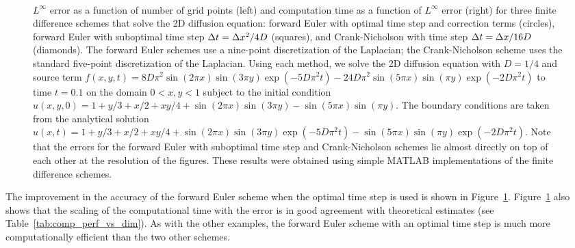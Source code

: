 \documentclass[oneeqnum,onefignum,onetabnum,onethmnum]{siamltex}
\begin{document}
\begin{figure}[tb]
\begin{center}
\ \ 
\caption{$L^\infty$ error as a function of number of grid points (left)
and computation time as a function of $L^\infty$ error (right) for three
finite difference schemes that solve the 2D diffusion equation:
forward Euler with optimal time step and correction terms (circles), forward 
Euler with suboptimal time step $\Delta t = \Delta x^2/4D$ (squares), and 
Crank-Nicholson with time step $\Delta t = \Delta x/16D$ (diamonds).  
The forward Euler schemes use a nine-point discretization of the Laplacian;
the Crank-Nicholson scheme uses the standard five-point discretization of
the Laplacian.  Using each method, we solve the 2D diffusion equation with 
$D = 1/4$ and source term 
$f(x,y,t) = 8 D \pi^2 \sin(2 \pi x) \sin(3 \pi y) 
            \exp\left(-5 D \pi^2 t\right)
          - 24 D \pi^2 \sin(5 \pi x) \sin(\pi y) 
            \exp \left(-2 D \pi^2 t \right)$
to time $t = 0.1$ on the domain $0 < x, y < 1$ subject 
to the initial condition
$u(x,y,0) =  1 + y/3 + x/2 + xy/4 
          + \sin(2 \pi x) \sin(3 \pi y) - \sin(5 \pi x) \sin(\pi y)$.
The boundary conditions are taken from the analytical solution 
$u(x,t) = 1 + y/3 + x/2 + xy/4 
          + \sin(2 \pi x) \sin(3 \pi y) \exp(-5 D \pi^2 t) 
          - \sin(5 \pi x) \sin(\pi y) \exp(-2 D \pi^2 t)
$.
Note that the errors for the forward Euler with suboptimal time step and 
Crank-Nicholson schemes lie almost directly on top of each other at the 
resolution of the figures.  
These results were obtained using simple MATLAB implementations of the 
finite difference schemes.
}
\label{fig:diffusion_eqn_2d_src_analysis}
\end{center}
\end{figure}

The improvement in the accuracy of the forward Euler scheme when the optimal 
time step is used is shown in Figure~\ref{fig:diffusion_eqn_2d_src_analysis}.
Figure~\ref{fig:diffusion_eqn_2d_src_analysis} also shows that the 
scaling of the computational time with the error is in good agreement with 
theoretical estimates (see Table~\ref{tab:comp_perf_vs_dim}).  As with the
other examples, the forward Euler scheme with an optimal time step is much 
more computationally efficient than the two other schemes.  
\end{document}
